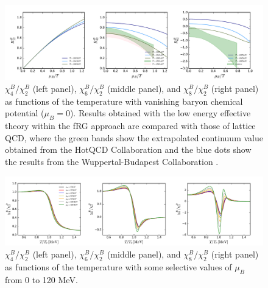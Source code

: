 \documentclass[%
reprint,
superscriptaddress,
showpacs,preprintnumbers,
 amsmath,amssymb,
 aps,
prd,
]{revtex4-1}
\begin{document}
%
\begin{figure}[t]
\includegraphics[width=1\textwidth]{R12R42R62-muBoT}
\caption{$\chi^{B}_{4}/\chi^{B}_{2}$ (left panel), $\chi^{B}_{6}/\chi^{B}_{2}$ (middle panel), and $\chi^{B}_{8}/\chi^{B}_{2}$ (right panel) as functions of the temperature with vanishing baryon chemical potential ($\mu_B=0$). Results obtained with the low energy effective theory within the fRG approach are compared with those of lattice QCD, where the green bands show the extrapolated continuum value obtained from the HotQCD Collaboration \cite{Bazavov:2017dus,Bazavov:2017tot} and the blue dots show the results from the Wuppertal-Budapest Collaboration \cite{Borsanyi:2018grb}.
}\label{fig:R12R42R62-muBoT}
\end{figure}
%

%
\begin{figure}[t]
\includegraphics[width=1\textwidth]{R42R62R82-T-muB0to120}
\caption{$\chi^{B}_{4}/\chi^{B}_{2}$ (left panel), $\chi^{B}_{6}/\chi^{B}_{2}$ (middle panel), and $\chi^{B}_{8}/\chi^{B}_{2}$ (right panel) as functions of the temperature with some selective values of $\mu_B$ from 0 to 120 MeV.}\label{fig:R42R62R82-T-muB0to120}
\end{figure}
%
\end{document}
